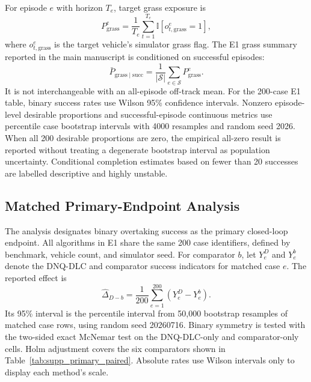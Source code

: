 \documentclass[journal]{IEEEtran}
\begin{document}
For episode $e$ with horizon $T_e$, target grass exposure is
\begin{equation}
P_{\mathrm{grass}}^{e}
=
\frac{1}{T_e}
\sum_{t=1}^{T_e}
\mathbb{I}[o_{t,\mathrm{grass}}^{e}=1],
\end{equation}
where $o_{t,\mathrm{grass}}^{e}$ is the target vehicle's simulator
grass flag. The E1 grass summary reported in the main manuscript is
conditioned on successful episodes:
\begin{equation}
\bar{P}_{\mathrm{grass}\mid\mathrm{succ}}
=
\frac{1}{|\mathcal{S}|}
\sum_{e\in\mathcal{S}}
P_{\mathrm{grass}}^{e}.
\end{equation}
It is not interchangeable with an all-episode off-track mean.
For the 200-case E1 table, binary success rates use Wilson 95\%
confidence intervals. Nonzero episode-level desirable proportions and
successful-episode continuous metrics use percentile case bootstrap
intervals with 4000 resamples and random seed 2026. When all 200
desirable proportions are zero, the empirical all-zero result is
reported without treating a degenerate bootstrap interval as population
uncertainty. Conditional completion estimates based on fewer than 20
successes are labelled descriptive and highly unstable.
\subsection{Matched Primary-Endpoint Analysis}
\label{supp:primary_endpoint}

The analysis designates binary overtaking success as the primary
closed-loop endpoint. All algorithms in E1 share the same 200 case
identifiers, defined by benchmark, vehicle count, and simulator seed.
For comparator $b$, let $Y_e^{D}$ and $Y_e^{b}$ denote the DNQ-DLC and
comparator success indicators for matched case $e$. The reported effect
is
\begin{equation}
\widehat{\Delta}_{D-b}
=
\frac{1}{200}\sum_{e=1}^{200}\left(Y_e^{D}-Y_e^{b}\right).
\end{equation}
Its 95\% interval is the percentile interval from 50,000 bootstrap
resamples of matched case rows, using random seed 20260716. Binary
symmetry is tested with the two-sided exact McNemar test on the
DNQ-DLC-only and comparator-only cells. Holm adjustment covers the six
comparators shown in Table~\ref{tab:supp_primary_paired}. Absolute rates
use Wilson intervals only to display each method's scale.
\end{document}
